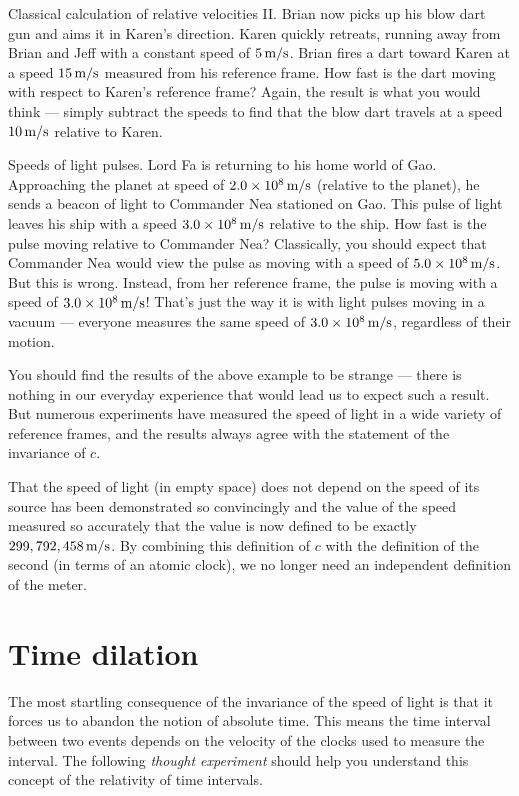 \begin{exampleb}{Classical calculation of relative velocities II.}
  Brian now picks up his blow dart gun and aims it in Karen's
  direction.  Karen quickly retreats, running away from Brian and Jeff
  with a constant speed of $5\,\mbox{m/s}$.  Brian fires a dart toward Karen at
  a speed $15\,\mbox{m/s}$ measured from his reference frame.  How fast is the
  dart moving with respect to Karen's reference frame?  \solution Again, the
  result is what you would think --- simply subtract the speeds to
  find that the blow dart travels at a speed $10\,\mbox{m/s}$ relative to Karen.
\end{exampleb}

\begin{exampleb}{Speeds of light pulses.}  
  Lord Fa is returning to his home world of Gao.  Approaching the
  planet at speed of $2.0\times 10^8\,\mbox{m/s}$ (relative to the planet), he
  sends a beacon of light to Commander Nea stationed on Gao.  This
  pulse of light leaves his ship with a speed $3.0\times 10^8\,\mbox{m/s}$
  relative to the ship.  How fast is the pulse moving relative to
  Commander Nea?  \solution Classically, you should expect that
  Commander Nea would view the pulse as moving with a speed of
  $5.0\times 10^8\,\mbox{m/s}$.  But this is wrong.  Instead, from her
  reference frame, the pulse is moving with a speed of $3.0\times
  10^8\,\mbox{m/s}$!  That's just the way it is with light pulses moving in a
  vacuum --- everyone measures the same speed of $3.0\times 10^8\,\mbox{m/s}$,
  regardless of their motion.
\end{exampleb}

You should find the results of the above example to be strange ---
there is nothing in our everyday experience that would lead us to
expect such a result.  But numerous experiments have measured the
speed of light in a wide variety of reference frames, and the
results always agree with the statement of the invariance of $c$.

That the speed of light (in empty space) does not depend on the speed
of its source has been demonstrated so convincingly and the value of
the speed measured so accurately that the value is now defined to be
exactly $299,792,458\,\mbox{m/s}$. By combining this definition of $c$ with the
definition of the second (in terms of an atomic clock), we no longer
need an independent definition of the meter.

\section{Time dilation}
\label{section:time-dilation}
The most startling consequence of the invariance of the speed of light
is that it forces us to abandon the notion of absolute time.  This
means the time interval between two events depends on the velocity of
the clocks used to measure the interval.  The following {\em thought
  experiment} should help you understand this concept of the
relativity of time intervals.
   
